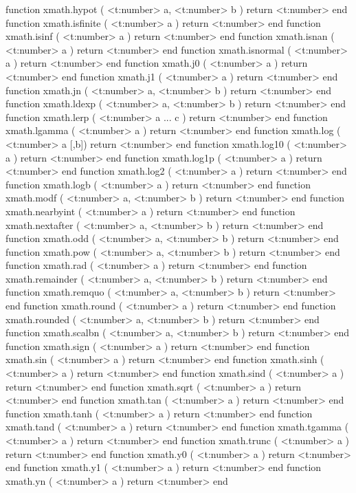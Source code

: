 function xmath.hypot      ( <t:number> a, <t:number> b ) return <t:number> end
function xmath.isfinite   ( <t:number> a )               return <t:number> end
function xmath.isinf      ( <t:number> a )               return <t:number> end
function xmath.isnan      ( <t:number> a )               return <t:number> end
function xmath.isnormal   ( <t:number> a )               return <t:number> end
function xmath.j0         ( <t:number> a )               return <t:number> end
function xmath.j1         ( <t:number> a )               return <t:number> end
function xmath.jn         ( <t:number> a, <t:number> b ) return <t:number> end
function xmath.ldexp      ( <t:number> a, <t:number> b ) return <t:number> end
function xmath.lerp       ( <t:number> a ... c         ) return <t:number> end
function xmath.lgamma     ( <t:number> a )               return <t:number> end
function xmath.log        ( <t:number> a [,b])           return <t:number> end
function xmath.log10      ( <t:number> a )               return <t:number> end
function xmath.log1p      ( <t:number> a )               return <t:number> end
function xmath.log2       ( <t:number> a )               return <t:number> end
function xmath.logb       ( <t:number> a )               return <t:number> end
function xmath.modf       ( <t:number> a, <t:number> b ) return <t:number> end
function xmath.nearbyint  ( <t:number> a )               return <t:number> end
function xmath.nextafter  ( <t:number> a, <t:number> b ) return <t:number> end
function xmath.odd        ( <t:number> a, <t:number> b ) return <t:number> end
function xmath.pow        ( <t:number> a, <t:number> b ) return <t:number> end
function xmath.rad        ( <t:number> a )               return <t:number> end
function xmath.remainder  ( <t:number> a, <t:number> b ) return <t:number> end
function xmath.remquo     ( <t:number> a, <t:number> b ) return <t:number> end
function xmath.round      ( <t:number> a )               return <t:number> end
function xmath.rounded    ( <t:number> a, <t:number> b ) return <t:number> end
function xmath.scalbn     ( <t:number> a, <t:number> b ) return <t:number> end
function xmath.sign       ( <t:number> a )               return <t:number> end
function xmath.sin        ( <t:number> a )               return <t:number> end
function xmath.sinh       ( <t:number> a )               return <t:number> end
function xmath.sind       ( <t:number> a )               return <t:number> end
function xmath.sqrt       ( <t:number> a )               return <t:number> end
function xmath.tan        ( <t:number> a )               return <t:number> end
function xmath.tanh       ( <t:number> a )               return <t:number> end
function xmath.tand       ( <t:number> a )               return <t:number> end
function xmath.tgamma     ( <t:number> a )               return <t:number> end
function xmath.trunc      ( <t:number> a )               return <t:number> end
function xmath.y0         ( <t:number> a )               return <t:number> end
function xmath.y1         ( <t:number> a )               return <t:number> end
function xmath.yn         ( <t:number> a )               return <t:number> end

